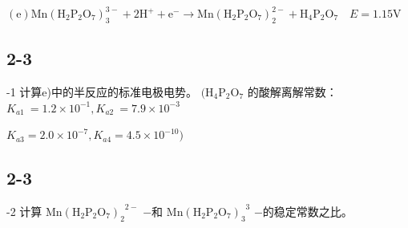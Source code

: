 $
\mathrm{(e)} \mathrm{Mn} (\mathrm{H} _ {2} \mathrm{P} _ {2} \mathrm{O} _ {7}) _ {3} ^ {3 -} + 2 \mathrm{H} ^ {+} + \mathrm{e} ^ {-} \rightarrow \mathrm{Mn} (\mathrm{H} _ {2} \mathrm{P} _ {2} \mathrm{O} _ {7}) _ {2} ^ {2 -} + \mathrm{H} _ {4} \mathrm{P} _ {2} \mathrm{O} _ {7} \quad E = 1. 1 5 \mathrm{V}
$

\subsection*{2-3}
-1 计算e)中的半反应的标准电极电势。 $\mathrm { ( H _ { 4 } P _ { 2 } O _ { 7 } }$ 的酸解离解常数： $K _ { a 1 } \ = 1 . 2 { \times } 1 0 ^ { - 1 } , K _ { a 2 } \ = 7 . 9 { \times } 1 0 ^ { - 3 }$

$
K _ {a 3} = 2. 0 \times 1 0 ^ {- 7}, K _ {a 4} = 4. 5 \times 1 0 ^ {- 1 0})
$

\subsection*{2-3}
-2 计算 $\mathrm { M n ( H _ { 2 } P _ { 2 } O _ { 7 } ) _ { 2 } } ^ { 2 - }$ −和 $\mathrm { M n ( H _ { 2 } P _ { 2 } O _ { 7 } ) _ { 3 } } ^ { 3 }$ −的稳定常数之⽐。
